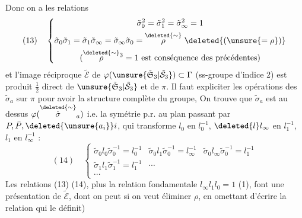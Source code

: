 Donc on a les relations
\[
(13)\quad\left\{\begin{gathered}
\tilde\sigma_0^2=\tilde\sigma_1^2=\tilde\sigma_\infty^2=1\\
\tilde\sigma_0\tilde\sigma_1=\tilde\sigma_1\tilde\sigma_\infty=\tilde\sigma_\infty\tilde\sigma_0
=\overset{\deleted{\sim}}{\rho}\ \deleted{(\unsure{=\rho})}\\
(\overset{\deleted{\sim}}{\rho}{}^3=1\text{ est conséquence des précédentes})
\end{gathered}\right.
\]
et l'image réciproque $\tilde{\mathcal E}$ de $\varphi(\unsure{\tilde{\mathfrak S}_3|\tilde{\mathcal S}_3})\subset\Gamma$ (ss-groupe d'indice 2) est produit $\frac12$ direct de $\unsure{\tilde{\mathfrak S}_3|\tilde{\mathcal S}_3}$ et de $\pi$. Il faut expliciter les opérations des $\tilde\sigma_a$ sur $\pi$ pour avoir la structure complète du groupe, On trouve que $\tilde\sigma_a$ est au dessus $\varphi(\overset{\deleted{\sim}}{\dot\sigma}_a)$ i.e. la symétrie p.r. au plan passant par $P,\bar P,\deleted{\unsure{a_i}}i$, qui transforme $l_0$ en $l_0^{-1}$, $\deleted{l}l_\infty$ en $l_1^{-1}$, $l_1$ en $l_\infty^{-1}$ :
\[
(14)\quad\left\{\begin{array}{lll}
\tilde\sigma_0l_0\tilde\sigma_0^{-1}=l_0^{-1}&
\tilde\sigma_0l_1\tilde\sigma_0^{-1}=l_\infty^{-1}&
\tilde\sigma_0l_\infty\tilde\sigma_0^{-1}=l_1^{-1}\\
\tilde\sigma_1l_1\tilde\sigma_1^{-1}=l_1^{-1}&\cdots&\\
\cdots&&
\end{array}\right.
\]
Les relations (13) (14), plus la relation fondamentale $l_\infty l_1l_0=1$ (1), font une présentation de $\tilde{\mathcal E}$, dont on peut si on veut éliminer $\rho$, \unsure{(}en omettant d'écrire la relation qui le définit)

